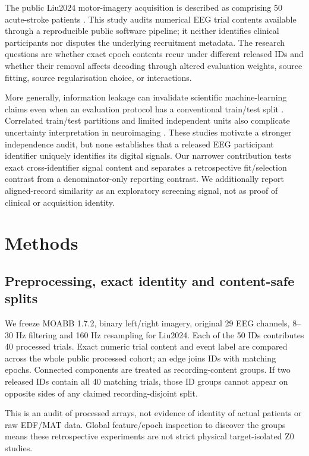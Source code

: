 \documentclass[11pt,a4paper]{article}
\begin{document}
The public Liu2024 motor-imagery acquisition is described as comprising
50 acute-stroke patients \cite{liu2024stroke}. This study audits numerical
EEG trial contents available through a reproducible public software
pipeline; it neither identifies clinical participants nor disputes the
underlying recruitment metadata. The research questions are whether
exact epoch contents recur under different released IDs and whether
their removal affects decoding through altered evaluation weights,
source fitting, source regularisation choice, or interactions.

More generally, information leakage can invalidate scientific
machine-learning claims even when an evaluation protocol has a
conventional train/test split \cite{kaufman2012leakage,kapoor2023leakage}.
Correlated train/test partitions and limited independent units also
complicate uncertainty interpretation in neuroimaging
\cite{varoquaux2018cv}. These studies motivate a stronger
independence audit, but none establishes that a released EEG
participant identifier uniquely identifies its digital signals.
Our narrower contribution tests exact cross-identifier signal
content and separates a retrospective fit/selection contrast
from a denominator-only reporting contrast. We additionally
report aligned-record similarity as an exploratory screening
signal, not as proof of clinical or acquisition identity.

\section{Methods}
\subsection{Preprocessing, exact identity and content-safe splits}
We freeze MOABB 1.7.2, binary left/right imagery, original 29 EEG
channels, 8--30 Hz filtering and 160 Hz resampling for Liu2024.
Each of the 50 IDs contributes 40 processed trials. Exact numeric
trial content and event label are compared across the whole
public processed cohort; an edge joins IDs with matching epochs.
Connected components are treated as recording-content groups. If two
released IDs contain all 40 matching trials, those ID groups cannot
appear on opposite sides of any claimed recording-disjoint split.

This is an audit of processed arrays, not evidence of identity
of actual patients or raw EDF/MAT data. Global feature/epoch
inspection to discover the groups means these retrospective
experiments are not strict physical target-isolated Z0 studies.
\end{document}
